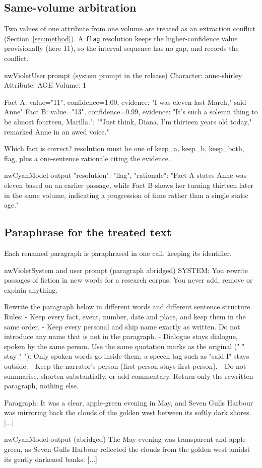 \subsection*{Same-volume arbitration}
Two values of one attribute from one volume are treated as an extraction conflict
(Section~\ref{sec:method}). A \texttt{flag} resolution keeps the higher-confidence value
provisionally (here 11), so the interval sequence has no gap, and records the conflict.
\begin{nwprompt}{nwViolet}{User prompt (system prompt in the release)}
Character: anne-shirley
Attribute: AGE
Volume: 1

Fact A: value="11", confidence=1.00, evidence: "I was eleven last March," said Anne"
Fact B: value="13", confidence=0.99, evidence: "It's such a solemn thing to be almost fourteen, Marilla."; ""Just think, Diana, I'm thirteen years old today," remarked Anne in an awed voice."

Which fact is correct? resolution must be one of keep_a, keep_b, keep_both, flag, plus a one-sentence rationale citing the evidence.
\end{nwprompt}
\begin{nwprompt}{nwCyan}{Model output}
{"resolution": "flag",
 "rationale": "Fact A states Anne was eleven based on an earlier passage, while Fact B shows her turning thirteen later in the same volume, indicating a progression of time rather than a single static age."}
\end{nwprompt}

\subsection*{Paraphrase for the treated text}
Each renamed paragraph is paraphrased in one call, keeping its identifier.
\begin{nwprompt}{nwViolet}{System and user prompt (paragraph abridged)}
SYSTEM: You rewrite passages of fiction in new words for a research corpus. You never add, remove or explain anything.

Rewrite the paragraph below in different words and different sentence structure.
Rules:
- Keep every fact, event, number, date and place, and keep them in the same order.
- Keep every personal and ship name exactly as written. Do not introduce any name that is not in the paragraph.
- Dialogue stays dialogue, spoken by the same person. Use the same quotation marks as the original (" " stay " "). Only spoken words go inside them; a speech tag such as "said I" stays outside.
- Keep the narrator's person (first person stays first person).
- Do not summarise, shorten substantially, or add commentary.
Return only the rewritten paragraph, nothing else.

Paragraph:
It was a clear, apple-green evening in May, and Seven Gulls Harbour was mirroring back the clouds of the golden west between its softly dark shores. [...]
\end{nwprompt}
\begin{nwprompt}{nwCyan}{Model output (abridged)}
The May evening was transparent and apple-green, as Seven Gulls Harbour reflected the clouds from the golden west amidst its gently darkened banks. [...]
\end{nwprompt}

